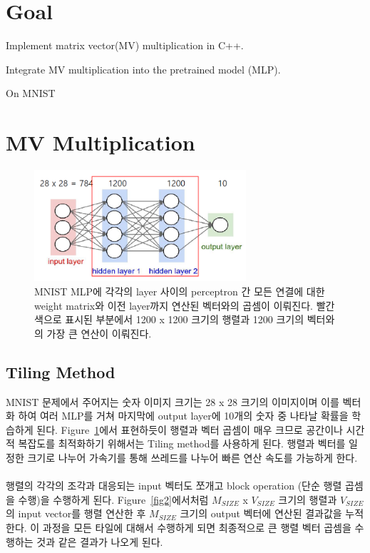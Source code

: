 \documentclass{article}
\begin{document}
\pagestyle{fancy}

\section*{Goal}

\begin{itemize*}
\item Implement matrix vector(MV) multiplication in C++.
\item Integrate MV multiplication into the pretrained model (MLP).
\begin{itemize*}
\item On MNIST
\end{itemize*}
\end{itemize*}

\section{MV Multiplication}

\begin{figure}[ht]
	\centering
	\includegraphics[width=0.7\textwidth]{fig1.png}
	\caption{MNIST MLP에 각각의 layer 사이의 perceptron 간 모든 연결에 대한 weight matrix와 이전 layer까지 연산된 벡터와의 곱셈이 이뤄진다. 빨간색으로 표시된 부분에서 1200 x 1200 크기의 행렬과 1200 크기의 벡터와의 가장 큰 연산이 이뤄진다. }
\label{fig1}
\end{figure}

\subsection*{Tiling Method}

MNIST 문제에서 주어지는 숫자 이미지 크기는 28 x 28 크기의 이미지이며 이를 벡터화 하여 여러 MLP를 거쳐 마지막에 output layer에 10개의 숫자 중 나타날 확률을 학습하게 된다. Figure~\ref{fig1}에서 표현하듯이 행렬과 벡터 곱셈이 매우 크므로 공간이나 시간적 복잡도를 최적화하기 위해서는 Tiling method를 사용하게 된다. 행렬과 벡터를 일정한 크기로 나누어 가속기를 통해 쓰레드를 나누어 빠른 연산 속도를 가능하게 한다.\\
\\
행렬의 각각의 조각과 대응되는 input 벡터도 쪼개고 block operation (단순 행렬 곱셈을 수행)을 수행하게 된다. Figure~\ref{fig2}에서처럼 $M_{SIZE}$ x $V_{SIZE}$ 크기의 행렬과 $V_{SIZE}$의 input vector를 행렬 연산한 후 $M_{SIZE}$ 크기의 output 벡터에 연산된 결과값을 누적한다. 이 과정을 모든 타일에 대해서 수행하게 되면 최종적으로 큰 행렬 벡터 곱셈을 수행하는 것과 같은 결과가 나오게 된다.
\end{document}
